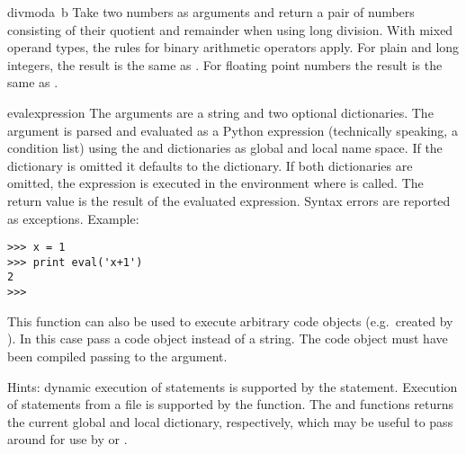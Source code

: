 \begin{funcdesc}{divmod}{a\, b}
  Take two numbers as arguments and return a pair of numbers consisting
  of their quotient and remainder when using long division.  With mixed
  operand types, the rules for binary arithmetic operators apply.  For
  plain and long integers, the result is the same as
  .
  For floating point numbers the result is the same as
  .
\end{funcdesc}

\begin{funcdesc}{eval}{expression}
  The arguments are a string and two optional dictionaries.  The
   argument is parsed and evaluated as a Python
  expression (technically speaking, a condition list) using the
   and  dictionaries as global and local name
  space.  If the  dictionary is omitted it defaults to
  the  dictionary.  If both dictionaries are omitted, the
  expression is executed in the environment where  is
  called.  The return value is the result of the evaluated expression.
  Syntax errors are reported as exceptions.  Example:

\begin{verbatim}
>>> x = 1
>>> print eval('x+1')
2
>>> 
\end{verbatim}
%
  This function can also be used to execute arbitrary code objects
  (e.g.\ created by ).  In this case pass a code
  object instead of a string.  The code object must have been compiled
  passing  to the  argument.

  Hints: dynamic execution of statements is supported by the
   statement.  Execution of statements from a file is
  supported by the  function.  The 
  and  functions returns the current global and local
  dictionary, respectively, which may be useful
  to pass around for use by  or .

\end{funcdesc}

